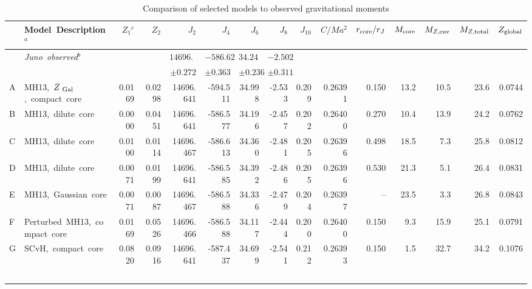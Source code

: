 \begin{sidewaystable}
\caption{Comparison of selected models to observed gravitational moments}
\label{tab:models}
\begin{tabular}{llrrrrrrrrrrrrr}
    \hline
    
    & Model~Description$^{a}$ &    $Z_1$$^{c}$ &        $Z_2$ &            $J_2$ &          $J_4$ &         $J_6$        &        $J_8$ &        $J_{10}$ &     $C/Ma^2$ &  $r_{\rm core}/r_J$ &     $M_{\rm core}$ &        $M_{Z,{\rm env}}$ &  $M_{Z,{\rm total}}$ &  $Z_{\rm global}$ \\
\hline
& \it{Juno}~observed$^{b}$                        & & & $14696.514$   & $-586.623$   &  $34.244$   & $-2.502$ &   &  &         &  &         &  &       \\
 &                                         & & & $\pm 0.272$   & $\pm 0.363$   &  $\pm 0.236$  & $\pm 0.311$ &  &  &         &  &         &  &       \\
\hline
A & MH13,~$Z_{\rm~Gal}$,~compact~core                &  0.0169  &  0.0298  &  14696.641  &  -594.511  &  34.998  &  -2.533  &  0.209  &  0.26391  &  0.150  &  13.2  &  10.5  &  23.6  &  0.0744  \\
\rowcolor{blue!15}
B & MH13,~dilute~core                   &  0.0000  &  0.0451  &  14696.641  &  -586.577  &  34.196  &  -2.457  &  0.202  &  0.26400  &  0.270  &  10.4  &  13.9  &  24.2  &  0.0762  \\
\rowcolor{blue!15}
C & MH13,~dilute~core                  &  0.0100  &  0.0114  &  14696.467  &  -586.613  &  34.360  &  -2.481  &  0.205  &  0.26396  &  0.498  &  18.5  &  7.3   &  25.8  &  0.0812  \\
\rowcolor{blue!15}
D & MH13,~dilute~core                 &  0.0071  &  0.0199  &  14696.641  &  -586.585  &  34.392  &  -2.486  &  0.205  &  0.26396  &  0.530  &  21.3  &  5.1   &  26.4  &  0.0831  \\
\rowcolor{blue!15}
E & MH13,~Gaussian~core                &  0.0071  &  0.0087  &  14696.467  &  -586.588  &  34.336  &  -2.479  &  0.204  &  0.26397  &  --     &  23.5  &  3.3   &  26.8  &  0.0843  \\
\rowcolor{blue!15}
F & Perturbed~MH13,~compact~core  &  0.0169  &  0.0526  &  14696.466  &  -586.588  &  34.117  &  -2.444  &  0.200  &  0.26400  &  0.150  &  9.3   &  15.9  &  25.1  &  0.0791  \\
G & SCvH,~compact~core                 &  0.0820  &  0.0916  & 14696.641 & -587.437 &  34.699  &  -2.541  &  0.212  &  0.26393  &  0.150  &  1.5   &  32.7 &  34.2  &  0.1076  \\
$$
\end{tabular}
\end{sidewaystable}
